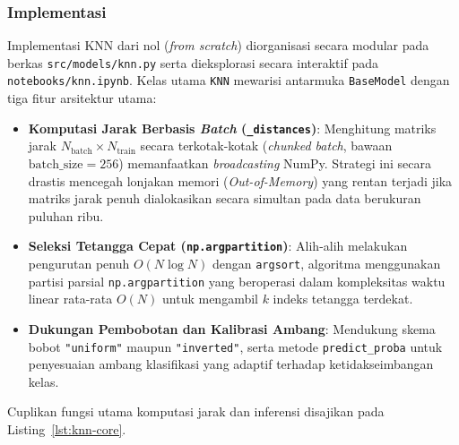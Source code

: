 \subsubsection{Implementasi}

Implementasi KNN dari nol (\textit{from scratch}) diorganisasi secara modular pada berkas
\texttt{src/models/knn.py} serta dieksplorasi secara interaktif pada \texttt{notebooks/knn.ipynb}.
Kelas utama \texttt{KNN} mewarisi antarmuka \texttt{BaseModel} dengan tiga fitur arsitektur utama:

\begin{itemize}
  \item \textbf{Komputasi Jarak Berbasis \textit{Batch} (\texttt{\_distances})}:
        Menghitung matriks jarak $N_{\text{batch}} \times N_{\text{train}}$ secara terkotak-kotak
        (\textit{chunked batch}, bawaan $\text{batch\_size} = 256$) memanfaatkan \textit{broadcasting}
        NumPy. Strategi ini secara drastis mencegah lonjakan memori (\textit{Out-of-Memory}) yang
        rentan terjadi jika matriks jarak penuh dialokasikan secara simultan pada data berukuran puluhan ribu.
  \item \textbf{Seleksi Tetangga Cepat (\texttt{np.argpartition})}:
        Alih-alih melakukan pengurutan penuh $O(N \log N)$ dengan \texttt{argsort}, algoritma
        menggunakan partisi parsial \texttt{np.argpartition} yang beroperasi dalam kompleksitas waktu
        linear rata-rata $O(N)$ untuk mengambil $k$ indeks tetangga terdekat.
  \item \textbf{Dukungan Pembobotan dan Kalibrasi Ambang}:
        Mendukung skema bobot \texttt{"uniform"} maupun \texttt{"inverted"}, serta metode
        \texttt{predict\_proba} untuk penyesuaian ambang klasifikasi yang adaptif terhadap ketidakseimbangan kelas.
\end{itemize}

Cuplikan fungsi utama komputasi jarak dan inferensi disajikan pada Listing~\ref{lst:knn-core}.

